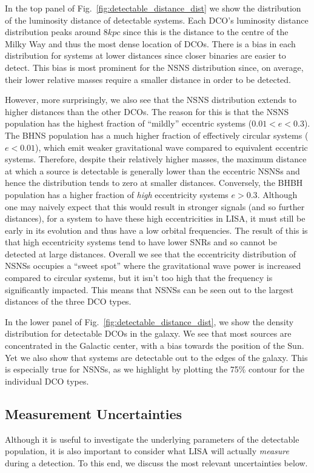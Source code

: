 In the top panel of Fig.~\ref{fig:detectable_distance_dist} we show the distribution of the luminosity distance of detectable systems. Each DCO's luminosity distance distribution peaks around $8 \unit{kpc}$ since this is the distance to the centre of the Milky Way and thus the most dense location of DCOs. There is a bias in each distribution for systems at lower distances since closer binaries are easier to detect. This bias is most prominent for the NSNS distribution since, on average, their lower relative masses require a smaller distance in order to be detected.

However, more surprisingly, we also see that the NSNS distribution extends to higher distances than the other DCOs. The reason for this is that the NSNS population has the highest fraction of ``mildly'' eccentric systems ($0.01 < e < 0.3$). The BHNS population has a much higher fraction of effectively circular systems ($e < 0.01$), which emit weaker gravitational wave compared to equivalent eccentric systems. Therefore, despite their relatively higher masses, the maximum distance at which a source is detectable is generally lower than the eccentric NSNSs and hence the distribution tends to zero at smaller distances. Conversely, the BHBH population has a higher fraction of \textit{high} eccentricity systems $e > 0.3$. Although one may naively expect that this would result in stronger signals (and so further distances), for a system to have these high eccentricities in LISA, it must still be early in its evolution and thus have a low orbital frequencies. The result of this is that high eccentricity systems tend to have lower SNRs and so cannot be detected at large distances. Overall we see that the eccentricity distribution of NSNSs occupies a ``sweet spot'' where the gravitational wave power is increased compared to circular systems, but it isn't too high that the frequency is significantly impacted. This means that NSNSs can be seen out to the largest distances of the three DCO types.

In the lower panel of Fig.~\ref{fig:detectable_distance_dist}, we show the density distribution for detectable DCOs in the galaxy. We see that most sources are concentrated in the Galactic center, with a bias towards the position of the Sun. Yet we also show that systems are detectable out to the edges of the galaxy. This is especially true for NSNSs, as we highlight by plotting the 75\% contour for the individual DCO types.

\subsection{Measurement Uncertainties}\label{sec:measurement_uncertainties}
Although it is useful to investigate the underlying parameters of the detectable population, it is also important to consider what LISA will actually \textit{measure} during a detection. To this end, we discuss the most relevant uncertainties below.

